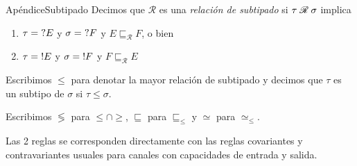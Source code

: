 \documentclass{beamer}
\begin{document}
\begin{frame}{Apéndice}{Subtipado}
    Decimos que $\mathscr{R}$ es una \emph{relación de subtipado} si $\tau \hspace{0.25em} \mathscr{R} \hspace{0.25em} \sigma$ implica
    \begin{enumerate}
        \item $\tau = \hspace{0.3em} ?E$ y $\sigma = \hspace{0.3em} ?F$ y $E \sqsubseteq_\mathscr{R} F$, o bien
        \item $\tau = \hspace{0.3em} !E$ y $\sigma = \hspace{0.3em} !F$ y $F \sqsubseteq_\mathscr{R} E$
    \end{enumerate}
    \vspace{1em}

    Escribimos $\leqslant$ para denotar la mayor relación de subtipado y decimos que $\tau$ es un subtipo de $\sigma$ si $\tau \leqslant \sigma$.
    \vspace{1em}

    Escribimos $\lessgtr$ para $\leqslant \cap \geqslant$, $\sqsubseteq$ para $\sqsubseteq_{\leqslant}$ y $\simeq$ para $\simeq_{\leqslant}$.
    \vspace{1em}

    Las 2 reglas se corresponden directamente con las reglas covariantes y contravariantes usuales para canales con capacidades de entrada y salida.
\end{frame}
\end{document}
